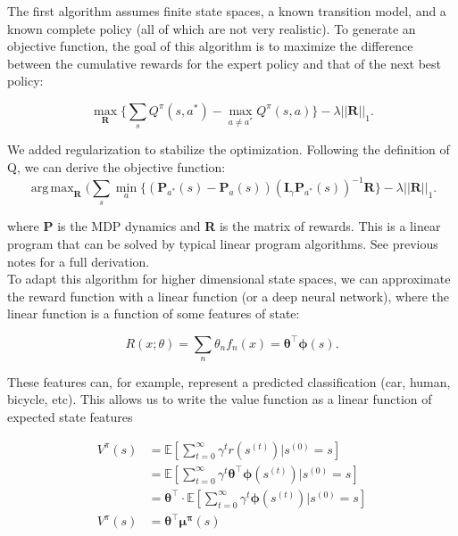 \documentclass[11pt]{article}
\DeclareMathOperator*{\argmax}{arg\,max}
\DeclareMathOperator*{\minimize}{min}
\DeclareMathOperator*{\maximize}{max}
\begin{document}
The first algorithm assumes finite state spaces, a known transition model, and a known complete policy (all of which are not very realistic). To generate an objective function, the goal of this algorithm is to maximize the difference between the cumulative rewards for the expert policy and that of the next best policy:

\begin{equation}
    \maximize_{\mathbf{R}} \{\sum_s Q^{\pi}(s, a^*) - \maximize_{a \ne a^*} Q^{\pi}(s,a)\} - \lambda ||\mathbf{R}||_1.
\end{equation}

We added regularization to stabilize the optimization. Following the definition of Q, we can derive the objective function:
\begin{equation}
    \argmax_{\mathbf{R}} (\sum_s \minimize_a \{(\mathbf{P}_{a^*}(s) - \mathbf{P}_{a}(s))(\mathbf{I}_ \gamma \mathbf{P}_{a^*}(s))^{-1} \mathbf{R}\} - \lambda ||\mathbf{R}||_1.
\end{equation}

where \textbf{P} is the MDP dynamics and \textbf{R} is the matrix of rewards. This is a linear program that can be solved by typical linear program algorithms. See previous notes for a full derivation. \\

To adapt this algorithm for higher dimensional state spaces, we can approximate the reward function with a linear function (or a deep neural network), where the linear function is a function of some features of state:

\begin{equation}
    R(x;\theta) = \sum_n \theta_n f_n(x) = \boldsymbol{\theta^{\top}} \boldsymbol{\phi}(s).
\end{equation}

These features can, for example, represent a predicted classification (car, human, bicycle, etc). This allows us to write the value function as a linear function of expected state features

\begin{equation}
\begin{split}
    V^{\pi}(s) & = \mathbb{E}[\sum_{t=0}^{\infty} \gamma^t r(s^{(t)})| s^{(0)} = s] \\
     & = \mathbb{E}[\sum_{t=0}^{\infty} \gamma^t \boldsymbol{\theta^{\top}} \boldsymbol{\phi}(s^{(t)})| s^{(0)} = s] \\
     & = \boldsymbol{\theta^{\top}} \cdot \mathbb{E}[\sum_{t=0}^{\infty} \gamma^t \boldsymbol{\phi}(s^{(t)})| s^{(0)} = s]  \\
    V^{\pi}(s) & = \boldsymbol{\theta^{\top}}\boldsymbol{\mu^{\pi}}(s) \\
\end{split}
\end{equation}
\end{document}
